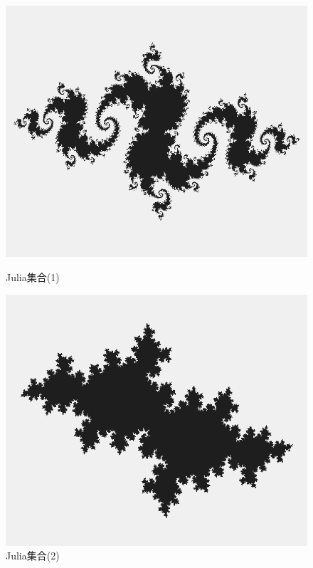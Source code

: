 \documentclass[dvipdfmx]{jsarticle}
\theoremstyle{definition}
\begin{document}
\vspace{\baselineskip}

\begin{figure}[ht]
\begin{minipage}{0.5\hsize}
    \begin{center}
        \includegraphics[scale=0.21]{figure/julia_set.png}
    \end{center}
    \caption{Julia集合(1)}
\end{minipage}
\begin{minipage}{0.49\hsize}
    \begin{center}
        \includegraphics[scale=0.21]{figure/julia_set2.png}
    \end{center}
    \caption{Julia集合(2)}
\end{minipage}
\end{figure}
\end{document}
